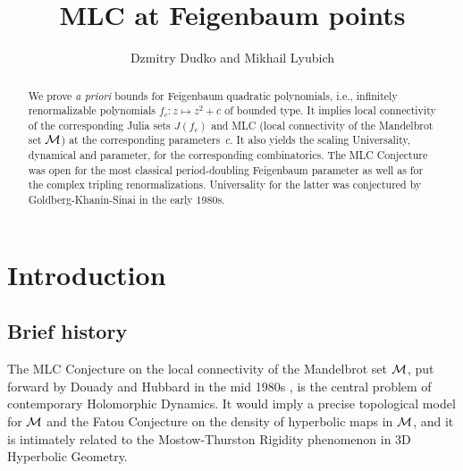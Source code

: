 \documentclass{amsart}
\newcommand{\1}{{\mathbb 1 }}
\begin{document}



\title[MLC at Feigenbaum points]{MLC at Feigenbaum points}

\author {Dzmitry Dudko and Mikhail Lyubich }






\bigskip\bigskip






\begin{abstract} 
  We prove {\em a priori} bounds for Feigenbaum quadratic polynomials,
  i.e., infinitely renormalizable polynomials $f_c: z\mapsto z^2+c$  of bounded type.
  It implies local connectivity of the corresponding Julia sets
  $J(f_c)$ and  MLC (local connectivity of the Mandelbrot set ${\mathcal{M}}$) at the
  corresponding parameters~$c$. It also yields the scaling
  Universality, dynamical and parameter, 
  for the corresponding combinatorics.  The MLC Conjecture was open for the most
  classical period-doubling Feigenbaum parameter  as well as for the complex tripling renormalizations.
  Universality for the latter was conjectured by Goldberg-Khanin-Sinai
  in the early 1980s.
\end{abstract}

\setcounter{tocdepth}{1}
 
\maketitle
\tableofcontents


\section{Introduction}
\subsection{Brief history} The MLC Conjecture on the local connectivity of the Mandelbrot set
${\mathcal{M}}$,
put forward by Douady and Hubbard in the mid 1980s \cite{DH:Orsay},  is the central problem
of contemporary Holomorphic Dynamics. It would imply a precise
topological model for ${\mathcal{M}}$ and
the Fatou Conjecture on the density of hyperbolic maps in ${\mathcal{M}}$,
and it is intimately related to the Mostow-Thurston Rigidity phenomenon
in 3D Hyperbolic Geometry.
\end{document}
